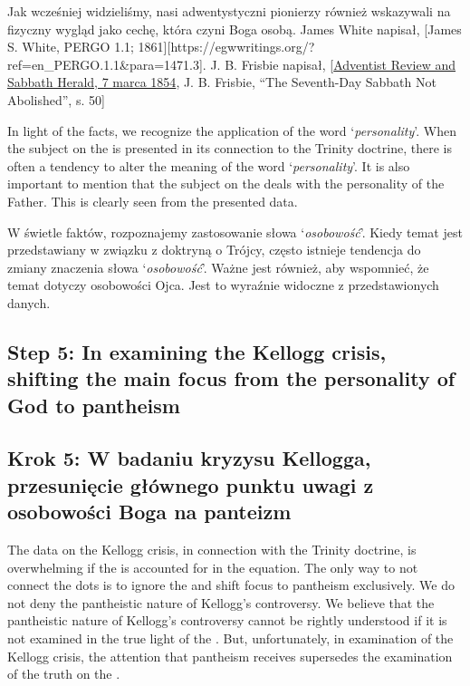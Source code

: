 Jak wcześniej widzieliśmy, nasi adwentystyczni pionierzy również wskazywali na fizyczny wygląd jako cechę, która czyni Boga osobą. James White napisał, [James S. White, PERGO 1.1; 1861][https://egwwritings.org/?ref=en\_PERGO.1.1&para=1471.3]. J. B. Frisbie napisał, [\href{https://documents.adventistarchives.org/Periodicals/RH/RH18540307-V05-07.pdf}{Adventist Review and Sabbath Herald, 7 marca 1854}, J. B. Frisbie, “The Seventh-Day Sabbath Not Abolished”, s. 50]


In light of the facts, we recognize the application of the word ‘\textit{personality}’. When the subject on the  is presented in its connection to the Trinity doctrine, there is often a tendency to alter the meaning of the word ‘\textit{personality}’. It is also important to mention that the subject on the  deals with the personality of the Father. This is clearly seen from the presented data.


W świetle faktów, rozpoznajemy zastosowanie słowa ‘\textit{osobowość}’. Kiedy temat  jest przedstawiany w związku z doktryną o Trójcy, często istnieje tendencja do zmiany znaczenia słowa ‘\textit{osobowość}’. Ważne jest również, aby wspomnieć, że temat  dotyczy osobowości Ojca. Jest to wyraźnie widoczne z przedstawionych danych.


\subsection*{Step 5: In examining the Kellogg crisis, shifting the main focus from the personality of God to pantheism}


\subsection*{Krok 5: W badaniu kryzysu Kellogga, przesunięcie głównego punktu uwagi z osobowości Boga na panteizm}


The data on the Kellogg crisis, in connection with the Trinity doctrine, is overwhelming if the  is accounted for in the equation. The only way to not connect the dots is to ignore the  and shift focus to pantheism exclusively. We do not deny the pantheistic nature of Kellogg's controversy. We believe that the pantheistic nature of Kellogg's controversy cannot be rightly understood if it is not examined in the true light of the . But, unfortunately, in examination of the Kellogg crisis, the attention that pantheism receives supersedes the examination of the truth on the .


